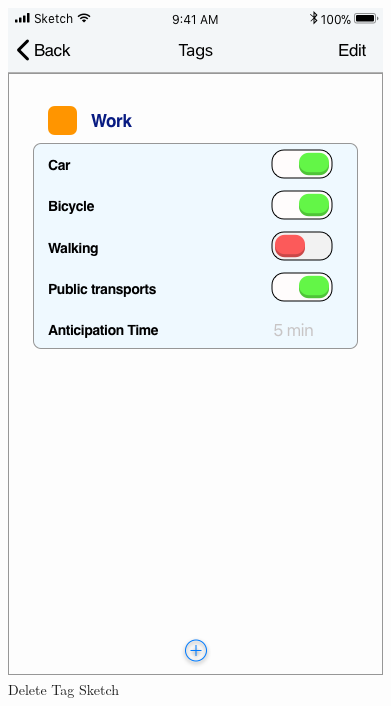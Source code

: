 \begin{figure}[H]
	\hspace{0.5cm}
	\includegraphics[scale=0.23]{Images/Interface/Tags/8_tags+work}
	\caption{Delete Tag Sketch}
\end{figure}

